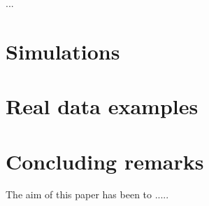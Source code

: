 \documentclass[preprint,12pt]{elsarticle}
\begin{document}
...



\section{Simulations}

\section{Real data examples}

\section{Concluding remarks}

The aim of this paper has been to .....
\newpage
\begin{thebibliography}{}
\end{thebibliography}
\end{document}
